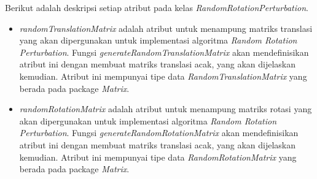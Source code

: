 Berikut adalah deskripsi setiap atribut pada kelas \textit{RandomRotationPerturbation}.
\begin{itemize}
	\item \textit{randomTranslationMatrix} adalah atribut untuk menampung matriks translasi yang akan dipergunakan untuk implementasi algoritma \textit{Random Rotation Perturbation}. Fungsi \textit{generateRandomTranslationMatrix} akan mendefinisikan atribut ini dengan membuat matriks translasi acak, yang akan dijelaskan kemudian. Atribut ini mempunyai tipe data \textit{RandomTranslationMatrix} yang berada pada package \textit{Matrix}.
	\item \textit{randomRotationMatrix} adalah atribut untuk menampung matriks rotasi yang akan dipergunakan untuk implementasi algoritma \textit{Random Rotation Perturbation}. Fungsi \textit{generateRandomRotationMatrix} akan mendefinisikan atribut ini dengan membuat matriks translasi acak, yang akan dijelaskan kemudian. Atribut ini mempunyai tipe data \textit{RandomRotationMatrix} yang berada pada package \textit{Matrix}.
\end{itemize}

